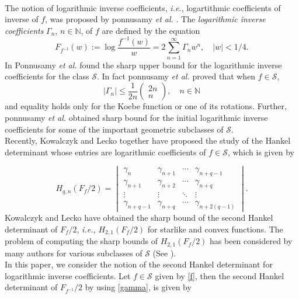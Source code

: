 \documentclass[a4paper,12pt]{amsart}
\theoremstyle{definition}
\numberwithin{equation}{section}
\begin{document}
\\[2mm]
The notion of logarithmic inverse coefficients, {\em i.e.}, logartithmic coefficients of inverse of $f$, was proposed by ponnusamy {\it et al.} \cite{samyinverselog}. The {\it logarithmic
inverse coefficients} $\Gamma_n$, $n \in \mathbb{N}$, of $f$ are defined by the equation
\begin{equation}\label{Gamma}
	F_{f^{-1}}(w):= \log\frac{f^{-1}(w)}{w}=2\sum\limits_{n=1}^{\infty}\Gamma_{n}w^{n}, \quad |w|<1/4.
\end{equation}
In \cite{samyinverselog} Ponnusamy {\it et al.} found the sharp upper bound  for the logarithmic inverse coefficients for the class $\mathcal{S}$. In fact ponnusamy {\it et al.} \cite{samyinverselog} proved that when $f\in \mathcal{S}$, $$|\Gamma_n| \leq \frac{1}{2n}
  \left(
  \begin{matrix}
    2n \\
    n
  \end{matrix}
  \right),
  \quad n \in \mathbb{N}
$$
and equality holds only for the Koebe function or one of its rotations. Further, ponnusamy {\it et al.} \cite{samyinverselog} obtained sharp bound for the initial logarithmic inverse coefficients for some of the important geometric subclasses of $
\mathcal{S}$.\\

Recently, Kowalczyk and Lecko \cite{adam} together have proposed the study of the Hankel determinant whose entries are logarithmic coefficients of $ f \in \mathcal{S}$, which is given by

$$
H_{q,n}(F_f/2) =
\begin{vmatrix}
	\gamma_n & \gamma_{n+1}  & \cdots & \gamma_{n+q-1} \\ 
	\gamma_{n+1} & \gamma_{n+2}  & \cdots & \gamma_{n+q} \\
	\vdots & \vdots &  \ddots &\vdots \\
	\gamma_{n+q-1} & \gamma_{n+q}  & \cdots & \gamma_{n+2(q-1)}
\end{vmatrix}.
$$
Kowalczyk and Lecko \cite{adam} have obtained the sharp bound of the second Hankel determinant of $F_f/2$, {\em i.e.,} $H_{2,1}(F_f/2)$ for starlike and convex functions. The problem of computing the sharp bounds of $H_{2,1}(F_f/2)$ has been considered by many authors for various subclasses of $\mathcal{S}$ (See \cite{vibhuthi,vibhuthi2,adam2,Mundalia}). 
\\

In this paper, we consider the notion of the second Hankel determinant for logarithmic inverse coefficients.
Let $ f \in \mathcal{S}$ given by \eqref{f}, then the second Hankel determinant of $F_{f^{-1}}/2$ by using \eqref{gamma}, is given by
\end{document}
